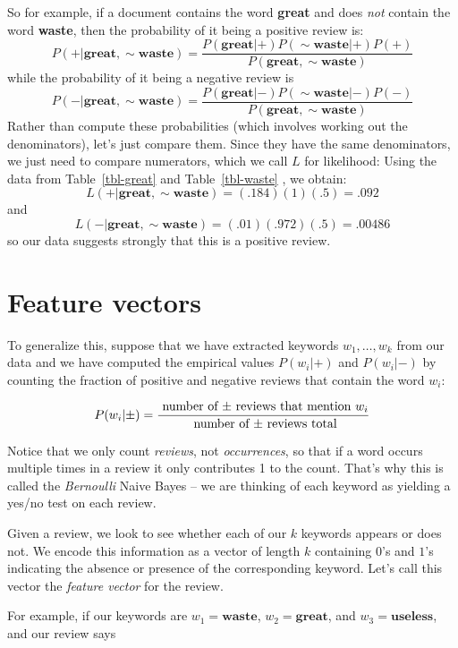 \documentclass[
  11pt,
  letterpaper,
]{scrbook}
\theoremstyle{plain}
\theoremstyle{remark}
\begin{document}
So for example, if a document contains the word \textbf{great} and does
\emph{not} contain the word \textbf{waste}, then the probability of it
being a positive review is: \[
P(+|\mathbf{great},\sim\mathbf{waste}) = \frac{P(\mathbf{great}|+)P(\sim\mathbf{waste}|+)P(+)}{P(\mathbf{great},\sim\mathbf{waste})}
\] while the probability of it being a negative review is \[
P(-|\mathbf{great},\sim\mathbf{waste}) = \frac{P(\mathbf{great}|-)P(\sim\mathbf{waste}|-)P(-)}{P(\mathbf{great},\sim\mathbf{waste})}
\] Rather than compute these probabilities (which involves working out
the denominators), let's just compare them. Since they have the same
denominators, we just need to compare numerators, which we call \(L\)
for likelihood: Using the data from Table~\ref{tbl-great} and
Table~\ref{tbl-waste} , we obtain: \[
L(+|\mathbf{great},\sim\mathbf{waste}) = (.184)(1)(.5) = .092
\] and \[
L(-|\mathbf{great},\sim\mathbf{waste}) = (.01)(.972)(.5) = .00486
\] so our data suggests strongly that this is a positive review.

\hypertarget{feature-vectors}{%
\section{Feature vectors}\label{feature-vectors}}

To generalize this, suppose that we have extracted keywords
\(w_1,\ldots, w_k\) from our data and we have computed the empirical
values \(P(w_{i}|+)\) and \(P(w_{i}|-)\) by counting the fraction of
positive and negative reviews that contain the word \(w_{i}\):

\[
P(w_{i}|\pm) = \frac{\hbox{ number of $\pm$ reviews that mention $w_{i}$}}{\hbox{ number of $\pm$ reviews total}}
\]

Notice that we only count \emph{reviews}, not \emph{occurrences}, so
that if a word occurs multiple times in a review it only contributes 1
to the count. That's why this is called the \emph{Bernoulli} Naive Bayes
-- we are thinking of each keyword as yielding a yes/no test on each
review.

Given a review, we look to see whether each of our \(k\) keywords
appears or does not. We encode this information as a vector of length
\(k\) containing \(0\)'s and \(1\)'s indicating the absence or presence
of the corresponding keyword. Let's call this vector the \emph{feature
vector} for the review.

For example, if our keywords are \(w_1=\mathbf{waste}\),
\(w_2=\mathbf{great}\), and \(w_3=\mathbf{useless}\), and our review
says
\end{document}
